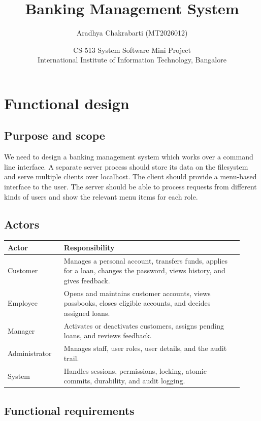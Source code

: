 \documentclass[11pt,a4paper]{article}
\title{Banking Management System}
\author{Aradhya Chakrabarti (MT2026012)}
\date{CS-513 System Software Mini Project\\ International Institute of Information Technology, Bangalore}
\begin{document}
\raggedbottom
\setlength{\emergencystretch}{3em}
\maketitle

\section{Functional design}
\label{sec:fdd}

\subsection{Purpose and scope}

We need to design a banking management system which works over a command line interface. A separate server process should store its data on the filesystem and serve multiple clients over localhost. The client should provide a menu-based interface to the user. The server should be able to process requests from different kinds of users and show the relevant menu items for each role.

\subsection{Actors}

\begin{longtable}{L{0.22\linewidth}L{0.70\linewidth}}
\hline
Actor & Responsibility \\
\hline
Customer & Manages a personal account, transfers funds, applies for a loan, changes the password, views history, and gives feedback. \\
Employee & Opens and maintains customer accounts, views passbooks, closes eligible accounts, and decides assigned loans. \\
Manager & Activates or deactivates customers, assigns pending loans, and reviews feedback. \\
Administrator & Manages staff, user roles, user details, and the audit trail. \\
System & Handles sessions, permissions, locking, atomic commits, durability, and audit logging. \\
\hline
\end{longtable}

\subsection{Functional requirements}
\end{document}
